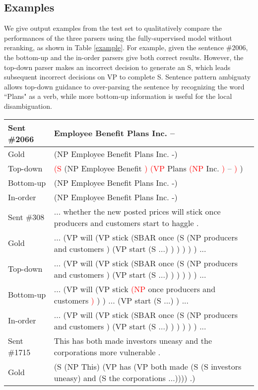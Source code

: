 \documentclass[11pt,letterpaper]{article}
\begin{document}
\subsection{Examples}
We give output examples from the test set to qualitatively compare the performances of the three parsers using the fully-supervised model without reranking, as shown in Table \ref{example}.
For example, given the sentence \#2006, the bottom-up and the in-order parsers give both correct results.
However, the top-down parser makes an incorrect decision to generate an S, which leads subsequent incorrect decisions on VP to complete S. 
Sentence pattern ambiguaty allows top-down guidance to over-parsing the sentence by recognizing the word ``Plans" as a verb, while more bottom-up information is useful for the local disambiguation.
\begin{table*}[!tp]
\begin{center}
\renewcommand{\arraystretch}{0.8}
\begin{tabular}{>{\small}l|>{\small}l}
\hline
Sent \#2066 & Employee Benefit Plans Inc. -- \\
\hline
Gold & (NP Employee Benefit Plans Inc. -) \\
Top-down & \textcolor{red}{(S }(NP Employee Benefit \textcolor{red}{)} \textcolor{red}{(VP} Plans \textcolor{red}{(NP} Inc. \textcolor{red}{)} -- \textcolor{red}{)} )\\
Bottom-up & (NP Employee Benefit Plans Inc. -) \\
In-order  & (NP Employee Benefit Plans Inc. -) \\
\hline
Sent \#308 & ... whether the new posted prices will stick once producers and customers start to haggle .\\
\hline
Gold & ... (VP will (VP stick (SBAR once (S (NP producers and customers ) (VP start (S ...) ) ) ) ) ) ... \\
Top-down & ... (VP will (VP stick (SBAR once (S (NP producers and customers ) (VP start (S ...) ) ) ) ) ) ... \\
Bottom-up &  ... (VP will (VP stick \textcolor{red}{(NP} once producers and customers \textcolor{red}{)} ) ) ... (VP start (S ...) ) ... \\
In-order & ... (VP will (VP stick (SBAR once (S (NP producers and customers ) (VP start (S ...) ) ) ) ) ) ... \\
\hline
Sent \#1715 & This has both made investors uneasy and the corporations more vulnerable .\\
\hline
Gold & (S (NP This) (VP has (VP both made (S (S investors uneasy) and (S the corporations ...)))) .) \\

\end{tabular}
\end{center}
\end{table*}
\end{document}
